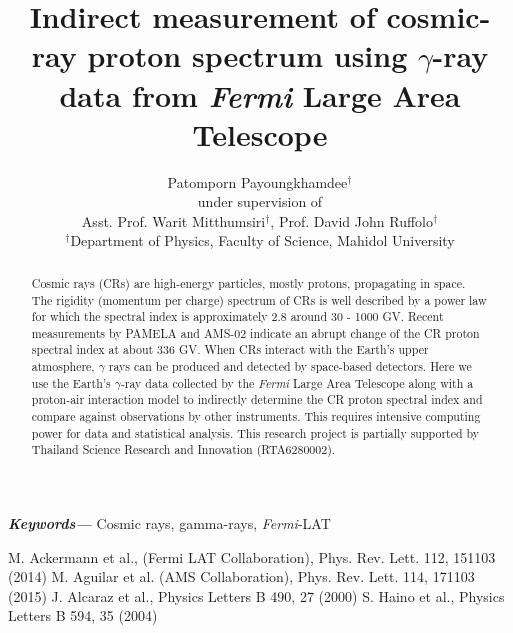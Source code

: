 \documentclass[a4paper, 12pt]{article}
\title{Indirect measurement of cosmic-ray proton spectrum using $\gamma$-ray data from {\it Fermi} Large Area Telescope}
\author{
  Patomporn Payoungkhamdee$^{\dagger}$\\
  under supervision of\\
  Asst. Prof. Warit Mitthumsiri$^{\dagger}$, Prof. David John Ruffolo$^{\dagger}$\\
  \small $^{\dagger}$Department of Physics, Faculty of Science, Mahidol University
}
\date{} %
\providecommand{\keywords}[1]
{
  \small	
  \textbf{\textit{Keywords---}} #1
}
\begin{document}
\maketitle

\begin{abstract}
\normalsize

Cosmic rays (CRs) are high-energy particles, mostly protons, propagating in space. The rigidity (momentum per charge) spectrum of CRs is well described by a power law for which the spectral index is approximately 2.8 around 30 - 1000 GV. Recent measurements by PAMELA and AMS-02 indicate an abrupt change of the CR proton spectral index at about 336 GV. When CRs interact with the Earth's upper atmosphere, $\gamma$ rays can be produced and detected by space-based detectors. Here we use the Earth's $\gamma$-ray data collected by the {\it Fermi} Large Area Telescope along with a proton-air interaction model to indirectly determine the CR proton spectral index and compare against observations by other instruments. This requires intensive computing power for data and statistical analysis. This research project is partially supported by Thailand Science Research and Innovation (RTA6280002).

\end{abstract}
\hspace{10pt}

\keywords{ Cosmic rays, gamma-rays, {\it Fermi}-LAT}
\begin{thebibliography}{00}
\bibitem{} M. Ackermann et al., (Fermi LAT Collaboration), Phys. Rev. Lett. 112, 151103 (2014)
\bibitem{} M. Aguilar et al. (AMS Collaboration), Phys. Rev. Lett. 114, 171103 (2015)
\bibitem{} J. Alcaraz et al., Physics Letters B 490, 27 (2000)
\bibitem{} S. Haino et al., Physics Letters B 594, 35 (2004)
\end{thebibliography}



\end{document}
